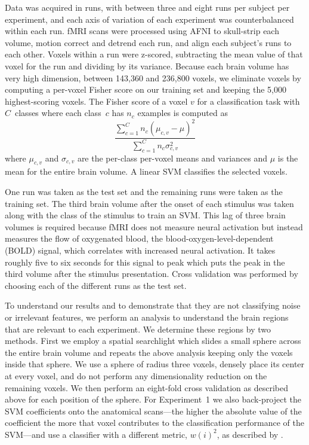 Data was acquired in runs, with between three and eight runs per subject per
experiment, and each axis of variation of each experiment was counterbalanced
within each run.
%
fMRI scans were processed using AFNI \citep{cox1996afni} to skull-strip each
volume, motion correct and detrend each run, and align each subject's runs to
each other.
%
Voxels within a run were z-scored, subtracting the mean value of that voxel for
the run and dividing by its variance.
%
Because each brain volume has very high dimension, between 143,360 and
236,800 voxels, we eliminate voxels by computing a per-voxel Fisher score on
our training set and keeping the 5,000 highest-scoring voxels.
%
The Fisher score of a voxel $v$ for a classification task with $C$~classes
where each class~$c$ has $n_c$ examples is computed as
%
\begin{equation}
  \frac{\displaystyle\sum_{c=1}^C n_c(\mu_{c,v}-\mu)^2}
       {\displaystyle\sum_{c=1}^C n_c \sigma_{c,v}^2}
\end{equation}
%
where $\mu_{c,v}$ and $\sigma_{c,v}$ are the per-class per-voxel means and
variances and $\mu$ is the mean for the entire brain volume.
%
A linear SVM classifies the selected voxels.

One run was taken as the test set and the remaining runs were taken as the
training set.
%
The third brain volume after the onset of each stimulus was taken along with
the class of the stimulus to train an SVM.\@
%
This lag of three brain volumes is required because fMRI does not measure
neural activation but instead measures the flow of oxygenated blood, the
blood-oxygen-level-dependent (BOLD) signal, which correlates with increased
neural activation.
%
It takes roughly five to six seconds for this signal to peak which puts the
peak in the third volume after the stimulus presentation.
%
Cross validation was performed by choosing each of the different runs as the
test set.

To understand our results and to demonstrate that they are not classifying
noise or irrelevant features, we perform an analysis to understand the brain
regions that are relevant to each experiment.
%
We determine these regions by two methods.
%
First we employ a spatial searchlight \citep{kriegeskorte2006information} which
slides a small sphere across the entire brain volume and repeats the above
analysis keeping only the voxels inside that sphere.
%
We use a sphere of radius three voxels, densely place its center at every
voxel, and do not perform any dimensionality reduction on the remaining voxels.
%
We then perform an eight-fold cross validation as described above for each
position of the sphere.
%
For Experiment~1 we also back-project the SVM coefficients onto the anatomical
scans---the higher the absolute value of the coefficient the more that voxel
contributes to the classification performance of the SVM---and use a classifier
with a different metric, $w(i)^2$, as described by \citet{hanson2009}.


